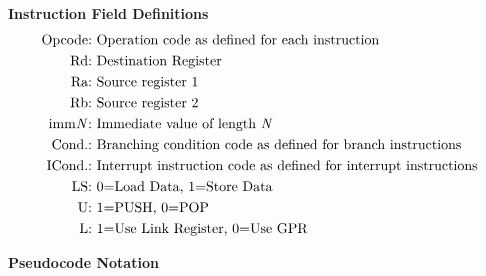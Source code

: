 \begingroup
\setlength{\abovedisplayskip}{0pt}
{\bf Instruction Field Definitions} \\
\begin{alignat*}{2}
	\text{Opcode:}& \text{ Operation code as defined for each instruction} \\
	\text{Rd:}& \text{ Destination Register} \\
	\text{Ra:}& \text{ Source register 1} \\
	\text{Rb:}& \text{ Source register 2} \\
	\text{imm\textit{N}:}& \text{ Immediate value of length \textit{N}} \\
	\text{Cond.:}& \text{ Branching condition code as defined for branch instructions} \\
	\text{ICond.:}& \text{ Interrupt instruction code as defined for interrupt instructions} \\
	\text{LS:}& \text{ 0=Load Data, 1=Store Data} \\
	\text{U:}& \text{ 1=PUSH, 0=POP} \\
	\text{L:}& \text{ 1=Use Link Register, 0=Use GPR} \\
\end{alignat*}
\endgroup

\newpage
{\bf Pseudocode Notation}
\begin{table}[h]
\centering
\footnotesize
{}
\end{table}\\

